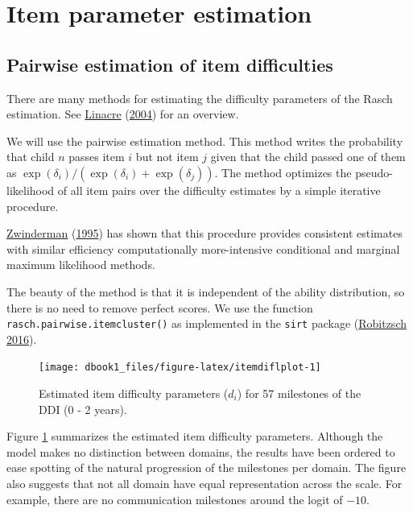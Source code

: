 \documentclass[
]{book}
\begin{document}
\hypertarget{sec:itemestimation}{%
\section{Item parameter estimation}\label{sec:itemestimation}}

\hypertarget{pairwise-estimation-of-item-difficulties}{%
\subsection{Pairwise estimation of item difficulties}\label{pairwise-estimation-of-item-difficulties}}

There are many methods for estimating the difficulty parameters of the Rasch estimation. See \protect\hyperlink{ref-linacre2004}{Linacre} (\protect\hyperlink{ref-linacre2004}{2004}) for an overview.

We will use the pairwise estimation method. This method writes the probability that child \(n\) passes item \(i\) but not item \(j\) given that the child passed one of them as \(\exp(\delta_i) / (\exp(\delta_i) + \exp(\delta_j))\). The method optimizes the pseudo-likelihood of all item pairs over the difficulty estimates by a simple iterative procedure.

\protect\hyperlink{ref-zwinderman1995}{Zwinderman} (\protect\hyperlink{ref-zwinderman1995}{1995}) has shown that this procedure provides consistent estimates with similar efficiency computationally more-intensive conditional and marginal maximum likelihood methods.

The beauty of the method is that it is independent of the ability distribution, so there is no need to remove perfect scores. We use the function \texttt{rasch.pairwise.itemcluster()} as implemented in the \texttt{sirt} package (\protect\hyperlink{ref-robitzsch2016}{Robitzsch 2016}).

\begin{figure}

{\centering \texttt{[image: dbook1\_files/figure-latex/itemdiflplot-1]} 

}

\caption{Estimated item difficulty parameters (\(d_i\)) for 57 milestones of the DDI (0 - 2 years).}\label{fig:itemdiflplot}
\end{figure}



Figure \ref{fig:itemdiflplot} summarizes the estimated item difficulty parameters. Although the model makes no distinction between domains, the results have been ordered to ease spotting of the natural progression of the milestones per domain. The figure also suggests that not all domain have equal representation across the scale. For example, there are no communication milestones around the logit of \(-10\).
\end{document}
